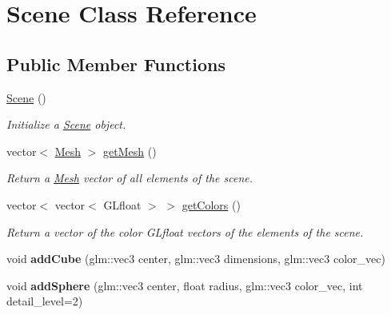 \hypertarget{classScene}{}\section{Scene Class Reference}
\label{classScene}
\subsection*{Public Member Functions}
\begin{DoxyCompactItemize}
\item 
\hyperlink{classScene_ad10176d75a9cc0da56626f682d083507}{Scene} ()\hypertarget{classScene_ad10176d75a9cc0da56626f682d083507}{}\label{classScene_ad10176d75a9cc0da56626f682d083507}

\begin{DoxyCompactList}\small\item\em Initialize a \hyperlink{classScene}{Scene} object. \end{DoxyCompactList}\item 
vector$<$ \hyperlink{classMesh}{Mesh} $>$ \hyperlink{classScene_a12e88ab3a99c3f5e46a18c71597e8aba}{get\+Mesh} ()\hypertarget{classScene_a12e88ab3a99c3f5e46a18c71597e8aba}{}\label{classScene_a12e88ab3a99c3f5e46a18c71597e8aba}

\begin{DoxyCompactList}\small\item\em Return a \hyperlink{classMesh}{Mesh} vector of all elements of the scene. \end{DoxyCompactList}\item 
vector$<$ vector$<$ G\+Lfloat $>$ $>$ \hyperlink{classScene_a02cb0b9e74e508d00ff4796843f63911}{get\+Colors} ()\hypertarget{classScene_a02cb0b9e74e508d00ff4796843f63911}{}\label{classScene_a02cb0b9e74e508d00ff4796843f63911}

\begin{DoxyCompactList}\small\item\em Return a vector of the color G\+Lfloat vectors of the elements of the scene. \end{DoxyCompactList}\item 
void {\bfseries add\+Cube} (glm\+::vec3 center, glm\+::vec3 dimensions, glm\+::vec3 color\+\_\+vec)\hypertarget{classScene_af4e4a7106047fcf25d31b83d2d6250ec}{}\label{classScene_af4e4a7106047fcf25d31b83d2d6250ec}

\item 
void {\bfseries add\+Sphere} (glm\+::vec3 center, float radius, glm\+::vec3 color\+\_\+vec, int detail\+\_\+level=2)\hypertarget{classScene_a16f73b7071459effba8ab735e052075d}{}\label{classScene_a16f73b7071459effba8ab735e052075d}


\end{DoxyCompactItemize}
